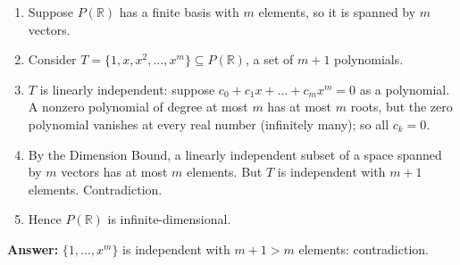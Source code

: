 \documentclass[11pt]{article}
\begin{document}
\begin{tcolorbox}[breakable,colback=ans,colframe=ansb,boxrule=0.5pt,left=4pt,right=4pt,top=2pt,bottom=2pt]\begin{enumerate}[leftmargin=3.1em,itemsep=1pt,topsep=1pt,label=\textbf{Step \arabic*.}]\item Suppose $P(\mathbb{R})$ has a finite basis with $m$ elements, so it is spanned by $m$ vectors.
\item Consider $T=\{1,x,x^{2},\dots,x^{m}\}\subseteq P(\mathbb{R})$, a set of $m+1$ polynomials.
\item $T$ is linearly independent: suppose $c_0+c_1x+\dots+c_mx^{m}=0$ as a polynomial. A nonzero polynomial of degree at most $m$ has at most $m$ roots, but the zero polynomial vanishes at every real number (infinitely many); so all $c_k=0$.
\item By the Dimension Bound, a linearly independent subset of a space spanned by $m$ vectors has at most $m$ elements. But $T$ is independent with $m+1$ elements. Contradiction.
\item Hence $P(\mathbb{R})$ is infinite-dimensional.
\end{enumerate}\textbf{Answer:} $\{1,\dots,x^{m}\}$ is independent with $m+1>m$ elements: contradiction.\end{tcolorbox}
\par\vspace{2pt}
\end{document}
